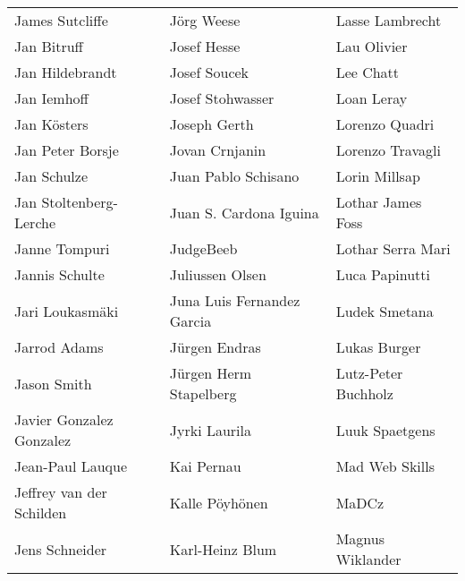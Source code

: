 \begin{tabular}{p{4.5cm}p{4.5cm}p{4.5cm}}
James Sutcliffe & Jörg Weese & Lasse Lambrecht \\
Jan Bitruff & Josef Hesse & Lau Olivier \\
Jan Hildebrandt & Josef Soucek & Lee Chatt \\
Jan Iemhoff & Josef Stohwasser & Loan Leray \\
Jan Kösters & Joseph Gerth & Lorenzo Quadri \\
Jan Peter Borsje & Jovan Crnjanin & Lorenzo Travagli \\
Jan Schulze & Juan Pablo Schisano & Lorin Millsap \\
Jan Stoltenberg-Lerche & Juan S. Cardona Iguina & Lothar James Foss \\
Janne Tompuri & JudgeBeeb & Lothar Serra Mari \\
Jannis Schulte & Juliussen Olsen & Luca Papinutti \\
Jari Loukasmäki & Juna Luis Fernandez Garcia & Ludek Smetana \\
Jarrod Adams & Jürgen Endras & Lukas Burger \\
Jason Smith & Jürgen Herm Stapelberg & Lutz-Peter Buchholz \\
Javier Gonzalez Gonzalez & Jyrki Laurila & Luuk Spaetgens \\
Jean-Paul Lauque & Kai Pernau & Mad Web Skills \\
Jeffrey van der Schilden & Kalle Pöyhönen & MaDCz \\
Jens Schneider & Karl-Heinz Blum & Magnus Wiklander \\
\end{tabular}
\newpage
\setlength{\tabcolsep}{1mm}
